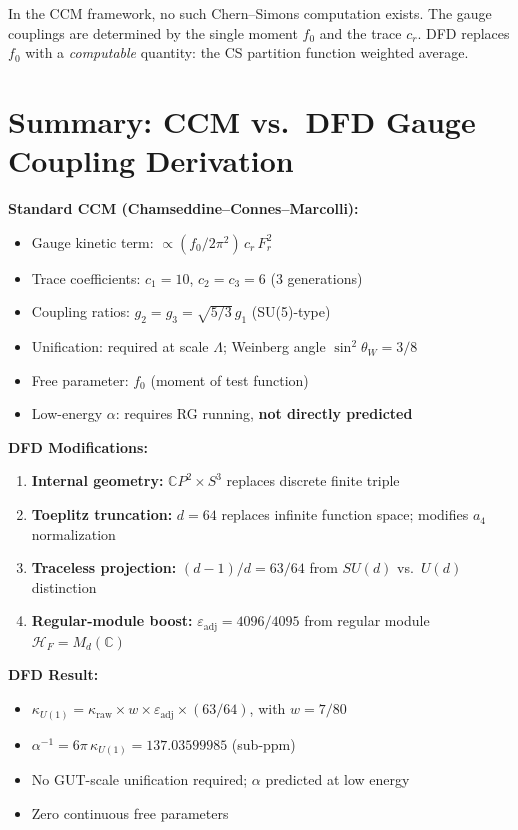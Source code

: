 \documentclass[12pt,a4paper]{article}
\begin{document}
In the CCM framework, no such Chern--Simons computation exists.  The gauge
couplings are determined by the single moment $f_0$ and the trace $c_r$.
DFD replaces $f_0$ with a \emph{computable} quantity: the CS partition function
weighted average.

\section{Summary: CCM vs.\ DFD Gauge Coupling Derivation}
\label{sec:summary}

\begin{tcolorbox}[colback=blue!5!white, colframe=blue!50!black,
  title=CCM vs.\ DFD: Gauge Coupling Comparison]

\textbf{Standard CCM (Chamseddine--Connes--Marcolli):}
\begin{itemize}
\item Gauge kinetic term: $\propto (f_0/2\pi^2)\,c_r\,F_r^2$
\item Trace coefficients: $c_1 = 10$, $c_2 = c_3 = 6$ (3 generations)
\item Coupling ratios: $g_2 = g_3 = \sqrt{5/3}\,g_1$ (SU(5)-type)
\item Unification: required at scale $\Lambda$; Weinberg angle $\sin^2\theta_W = 3/8$
\item Free parameter: $f_0$ (moment of test function)
\item Low-energy $\alpha$: requires RG running, \textbf{not directly predicted}
\end{itemize}

\textbf{DFD Modifications:}
\begin{enumerate}
\item \textbf{Internal geometry:} $\mathbb{C}P^2 \times S^3$ replaces
  discrete finite triple
\item \textbf{Toeplitz truncation:} $d = 64$ replaces infinite function space;
  modifies $a_4$ normalization
\item \textbf{Traceless projection:} $(d-1)/d = 63/64$ from $SU(d)$ vs.\ $U(d)$
  distinction
\item \textbf{Regular-module boost:} $\varepsilon_{\mathrm{adj}} = 4096/4095$
  from regular module $\mathcal{H}_F = M_d(\mathbb{C})$
\end{enumerate}

\textbf{DFD Result:}
\begin{itemize}
\item $\kappa_{U(1)} = \kappa_{\mathrm{raw}} \times w \times \varepsilon_{\mathrm{adj}}
  \times (63/64)$, with $w = 7/80$
\item $\alpha^{-1} = 6\pi\,\kappa_{U(1)} = 137.03599985$ (sub-ppm)
\item No GUT-scale unification required; $\alpha$ predicted at low energy
\item Zero continuous free parameters
\end{itemize}

\end{tcolorbox}
\end{document}
